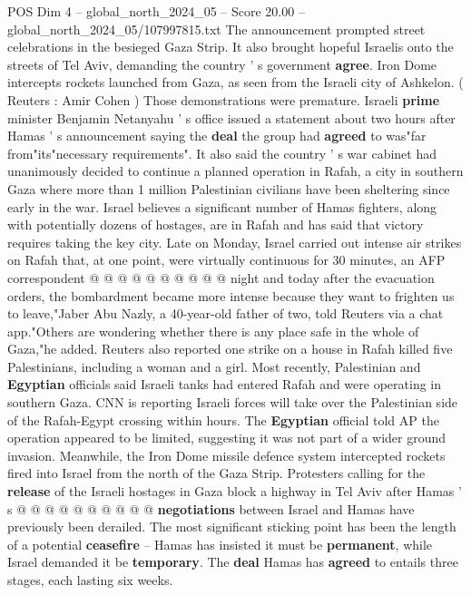 \begin{textsample}{POS Dim 4 – global\_north\_2024\_05 – Score 20.00 – global\_north\_2024\_05/107997815.txt}  \label{ex:f4_pos_346}
The announcement prompted street celebrations in the besieged Gaza Strip.
It also brought hopeful Israelis onto the streets of Tel Aviv, demanding the country ' s government \textbf{agree}.
Iron Dome intercepts rockets launched from Gaza, as seen from the Israeli city of Ashkelon. ( Reuters : Amir Cohen ) Those demonstrations were premature.
Israeli \textbf{prime} minister Benjamin Netanyahu ' s office issued a statement about two hours after Hamas ' s announcement saying the \textbf{deal} the group had \textbf{agreed} to was"far from"its"necessary requirements".
It also said the country ' s war cabinet had unanimously decided to continue a planned operation in Rafah, a city in southern Gaza where more than 1 million Palestinian civilians have been sheltering since early in the war.
Israel believes a significant number of Hamas fighters, along with potentially dozens of hostages, are in Rafah and has said that victory requires taking the key city.
Late on Monday, Israel carried out intense air strikes on Rafah that, at one point, were virtually continuous for 30 minutes, an AFP correspondent @ @ @ @ @ @ @ @ @ @ night and today after the evacuation orders, the bombardment became more intense because they want to frighten us to leave,"Jaber Abu Nazly, a 40-year-old father of two, told Reuters via a chat app."Others are wondering whether there is any place safe in the whole of Gaza,"he added.
Reuters also reported one strike on a house in Rafah killed five Palestinians, including a woman and a girl.
Most recently, Palestinian and \textbf{Egyptian} officials said Israeli tanks had entered Rafah and were operating in southern Gaza.
CNN is reporting Israeli forces will take over the Palestinian side of the Rafah-Egypt crossing within hours.
The \textbf{Egyptian} official told AP the operation appeared to be limited, suggesting it was not part of a wider ground invasion.
Meanwhile, the Iron Dome missile defence system intercepted rockets fired into Israel from the north of the Gaza Strip.
Protesters calling for the \textbf{release} of the Israeli hostages in Gaza block a highway in Tel Aviv after Hamas ' s @ @ @ @ @ @ @ @ @ @ \textbf{negotiations} between Israel and Hamas have previously been derailed.
The most significant sticking point has been the length of a potential \textbf{ceasefire} -- Hamas has insisted it must be \textbf{permanent}, while Israel demanded it be \textbf{temporary}.
The \textbf{deal} Hamas has \textbf{agreed} to entails three stages, each lasting six weeks.

\end{textsample}
